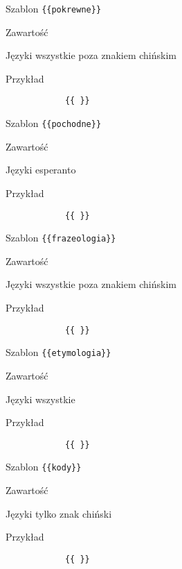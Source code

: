 \documentclass{pracamgr}
\begin{document}
\spacer
\begin{description-sub}
	\item[Szablon] \verb|{{pokrewne}}|
	\item[Zawartość]
	\item[Języki] wszystkie poza znakiem chińskim
	\item[Przykład]
		\begin{verbatim}
			{{ }}
		\end{verbatim}
\end{description-sub}
\spacer
\begin{description-sub}
	\item[Szablon] \verb|{{pochodne}}|
	\item[Zawartość]
	\item[Języki] esperanto
	\item[Przykład]
		\begin{verbatim}
			{{ }}
		\end{verbatim}
\end{description-sub}
\spacer
\begin{description-sub}
	\item[Szablon] \verb|{{frazeologia}}|
	\item[Zawartość]
	\item[Języki] wszystkie poza znakiem chińskim
	\item[Przykład]
		\begin{verbatim}
			{{ }}
		\end{verbatim}
\end{description-sub}
\spacer
\begin{description-sub}
	\item[Szablon] \verb|{{etymologia}}|
	\item[Zawartość]
	\item[Języki] wszystkie
	\item[Przykład]
		\begin{verbatim}
			{{ }}
		\end{verbatim}
\end{description-sub}
\spacer
\begin{description-sub}
	\item[Szablon] \verb|{{kody}}|
	\item[Zawartość]
	\item[Języki] tylko znak chiński
	\item[Przykład]
		\begin{verbatim}
			{{ }}
		\end{verbatim}
\end{description-sub}
\end{document}
